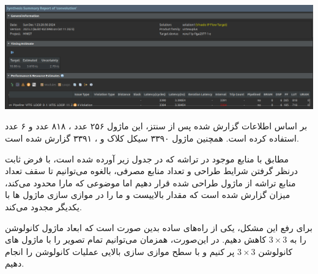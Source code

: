 \begin{qsolve}
	\begin{center}
		\includegraphics*[width=1\linewidth]{pics/img6.png}
		\label{ریپورت سنتز HLS}
	\end{center}
	
	بر اساس اطلاعات گزارش شده پس از سنتز، این ماژول ۲۵۶ عدد ،
	۸۱۸ عدد  و ۶ عدد  استفاده کرده است. همچنین  ماژول ۳۳۹۰ سیکل کلاک و ، ۳۳۹۱ گزارش شده است.
	
	مطابق با منابع موجود در تراشه  که در جدول زیر آورده شده است، با فرض ثابت درنظر گرفتن شرایط طراحی و تعداد منابع مصرفی، بالغوه می‌توانیم تا سقف تعداد منابع تراشه از ماژول طراحی شده قرار دهیم اما موضوعی که مارا محدود می‌کند، میزان  گزارش شده است که مقدار بالاییست و ما را در موازی سازی ماژول ها با یکدیگر مجدود می‌کند.
	
	برای رفع این مشکل، یکی از راه‌های ساده بدین صورت است که ابعاد ماژول کانولوشن را به $3 \times 3 $ کاهش دهیم. در این‌صورت، همزمان می‌توانیم تمام تصویر را با ماژول های کانولوشن $3 \times 3 $ پر کنیم و با سطح موازی سازی بالایی عملیات کانولوشن را انجام دهیم.
	
\end{qsolve}